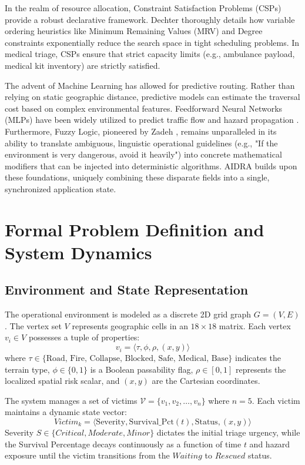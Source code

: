 \documentclass[conference]{IEEEtran}
\begin{document}
In the realm of resource allocation, Constraint Satisfaction Problems (CSPs) provide a robust declarative framework. Dechter \cite{csp} thoroughly details how variable ordering heuristics like Minimum Remaining Values (MRV) and Degree constraints exponentially reduce the search space in tight scheduling problems. In medical triage, CSPs ensure that strict capacity limits (e.g., ambulance payload, medical kit inventory) are strictly satisfied.

The advent of Machine Learning has allowed for predictive routing. Rather than relying on static geographic distance, predictive models can estimate the traversal cost based on complex environmental features. Feedforward Neural Networks (MLPs) have been widely utilized to predict traffic flow and hazard propagation \cite{mlp}. Furthermore, Fuzzy Logic, pioneered by Zadeh \cite{fuzzy}, remains unparalleled in its ability to translate ambiguous, linguistic operational guidelines (e.g., "If the environment is very dangerous, avoid it heavily") into concrete mathematical modifiers that can be injected into deterministic algorithms. AIDRA builds upon these foundations, uniquely combining these disparate fields into a single, synchronized application state.

\section{Formal Problem Definition and System Dynamics}

\subsection{Environment and State Representation}
The operational environment is modeled as a discrete 2D grid graph $G = (V, E)$. The vertex set $V$ represents geographic cells in an $18 \times 18$ matrix. Each vertex $v_i \in V$ possesses a tuple of properties:
\begin{equation}
    v_i = \langle \tau, \phi, \rho, (x, y) \rangle
\end{equation}
where $\tau \in \{\text{Road, Fire, Collapse, Blocked, Safe, Medical, Base}\}$ indicates the terrain type, $\phi \in \{0, 1\}$ is a Boolean passability flag, $\rho \in [0, 1]$ represents the localized spatial risk scalar, and $(x, y)$ are the Cartesian coordinates.

The system manages a set of victims $\mathcal{V} = \{v_1, v_2, \ldots, v_n\}$ where $n=5$. Each victim maintains a dynamic state vector:
\begin{equation}
    Victim_k = \langle \text{Severity}, \text{Survival\_Pct}(t), \text{Status}, (x,y) \rangle
\end{equation}
Severity $S \in \{Critical, Moderate, Minor\}$ dictates the initial triage urgency, while the Survival Percentage decays continuously as a function of time $t$ and hazard exposure until the victim transitions from the $Waiting$ to $Rescued$ status.
\end{document}
